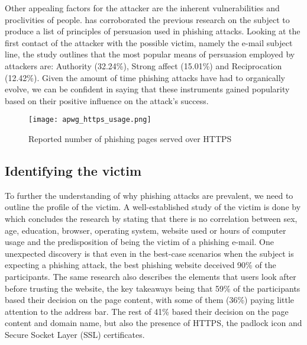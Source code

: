 Other appealing factors for the attacker are the inherent vulnerabilities and
proclivities of people. \cite{PRINCIPLES_OF_PERSUASION} has corroborated the
previous research on the subject to produce a list of principles of persuasion
used in phishing attacks. Looking at the first contact of the attacker with the
possible victim, namely the e-mail subject line, the study outlines that the
most popular means of persuasion employed by attackers are: Authority (32.24\%),
Strong affect (15.01\%) and Reciprocation (12.42\%). Given the amount of time
phishing attacks have had to organically evolve, we can be confident in saying
that these instruments gained popularity based on their positive influence on
the attack's success.

\begin{figure}[!b]
	\centering
	\texttt{[image: apwg\_https\_usage.png]}
	\caption{
		Reported number of phishing pages served over \gls{HTTPS} \citep{APWG_Q42019}}
	\label{fig:HTTPS_USAGE}
\end{figure}


\subsection{Identifying the victim}
To further the understanding of why phishing attacks are prevalent, we need to
outline the profile of the victim. A well-established study of the victim is
done by \cite{WHY_PHISHING_WORKS} which concludes the research by stating that
there is no correlation between sex, age, education, browser, operating system,
website used or hours of computer usage and the predisposition of being the victim
of a phishing e-mail. One unexpected discovery is that even in the best-case
scenarios when the subject is expecting a phishing attack, the best phishing
website deceived 90\% of the participants. The same research also describes the
elements that users look after before trusting the website, the key takeaways
being that 59\% of the participants based their decision on the page content,
with some of them (36\%) paying little attention to the address bar. The rest of
41\% based their decision on the page content and domain name, but also the
presence of \gls{HTTPS}, the padlock icon and Secure Socket Layer (\gls{SSL}) certificates.

